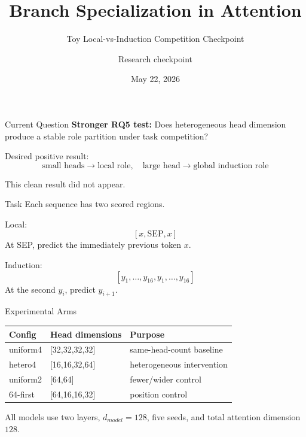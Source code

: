 \documentclass[aspectratio=169]{beamer}
\title{Branch Specialization in Attention}
\subtitle{Toy Local-vs-Induction Competition Checkpoint}
\author{Research checkpoint}
\date{May 22, 2026}
\begin{document}
\begin{frame}
  \titlepage
\end{frame}

\begin{frame}{Current Question}
  \textbf{Stronger RQ5 test:} Does heterogeneous head dimension produce a
  stable role partition under task competition?

  \vspace{0.7em}
  Desired positive result:
  \[
    \text{small heads} \rightarrow \text{local role}, \quad
    \text{large head} \rightarrow \text{global induction role}
  \]

  \vspace{0.7em}
  This clean result did not appear.
\end{frame}

\begin{frame}{Task}
  Each sequence has two scored regions.

  \vspace{0.5em}
  Local:
  \[
    [x,\mathrm{SEP},x]
  \]
  At SEP, predict the immediately previous token \(x\).

  \vspace{0.5em}
  Induction:
  \[
    [y_1,\ldots,y_{16},y_1,\ldots,y_{16}]
  \]
  At the second \(y_i\), predict \(y_{i+1}\).
\end{frame}

\begin{frame}{Experimental Arms}
  \begin{table}
    \centering
    \begin{tabular}{lll}
      \toprule
      Config & Head dimensions & Purpose \\
      \midrule
      uniform4 & [32,32,32,32] & same-head-count baseline \\
      hetero4 & [16,16,32,64] & heterogeneous intervention \\
      uniform2 & [64,64] & fewer/wider control \\
      64-first & [64,16,16,32] & position control \\
      \bottomrule
    \end{tabular}
  \end{table}

  All models use two layers, \(d_{model}=128\), five seeds, and total attention
  dimension \(128\).
\end{frame}
\end{document}
